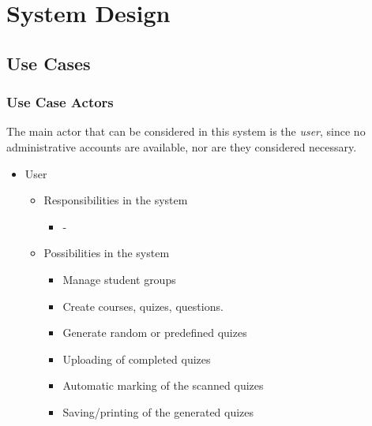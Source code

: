 \section{System Design}


\subsection{Use Cases}

\subsubsection{Use Case Actors}
The main actor that can be considered in this system is the \textit{user}, since no administrative accounts are available, nor are they considered necessary.
\begin{itemize}
  \item User
  \begin{itemize}
    \item Responsibilities in the system
    \begin{itemize}
      \item -
    \end{itemize}
    \item Possibilities in the system
    \begin{itemize}
      \item Manage student groups 
      \item Create courses, quizes, questions.
      \item Generate random or predefined quizes
      \item Uploading of completed quizes
      \item Automatic marking of the scanned quizes
      \item Saving/printing of the generated quizes
    \end{itemize}
  \end{itemize}
\end{itemize}


